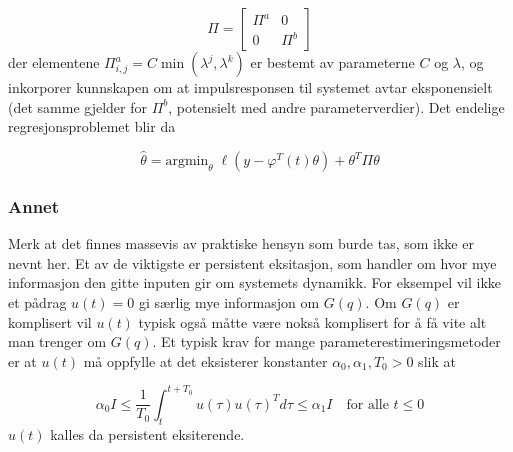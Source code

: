 \begin{equation}
	\Pi = \begin{bmatrix}
		\Pi^a & 0 \\
		0 & \Pi^b
	\end{bmatrix}
\end{equation}
der elementene $\Pi^a_{i, j} = C \min(\lambda^j, \lambda^k)$ er bestemt av parameterne $C$ og $\lambda$, og inkorporer kunnskapen om at impulsresponsen til systemet avtar eksponensielt (det samme gjelder for $\Pi^b$, potensielt med andre parameterverdier). Det endelige regresjonsproblemet blir da

\begin{equation}
	\hat{\theta} = \textrm{argmin}_\theta \; \ell (y - \varphi ^T (t) \theta) + \theta^T \Pi \theta
\end{equation}

\subsubsection{Annet}
Merk at det finnes massevis av praktiske hensyn som burde tas, som ikke er nevnt her. Et av de viktigste er persistent eksitasjon, som handler om hvor mye informasjon den gitte inputen gir om systemets dynamikk. For eksempel vil ikke et pådrag $u(t) = 0$ gi særlig mye informasjon om $G(q)$. Om $G(q)$ er komplisert vil $u(t)$ typisk også måtte være nokså komplisert for å få vite alt man trenger om $G(q)$. Et typisk krav for mange parameterestimeringsmetoder er at $u(t)$ må oppfylle at det eksisterer konstanter $\alpha_0, \alpha_1, T_0 > 0$ slik at 

\begin{equation}
	\alpha_0 I \leq \frac{1}{T_0} \int_t^{t + T_0} u(\tau) u(\tau)^T d\tau \leq \alpha_1 I \quad \textrm{for alle } t \leq 0
\end{equation}
$u(t)$ kalles da persistent eksiterende.

